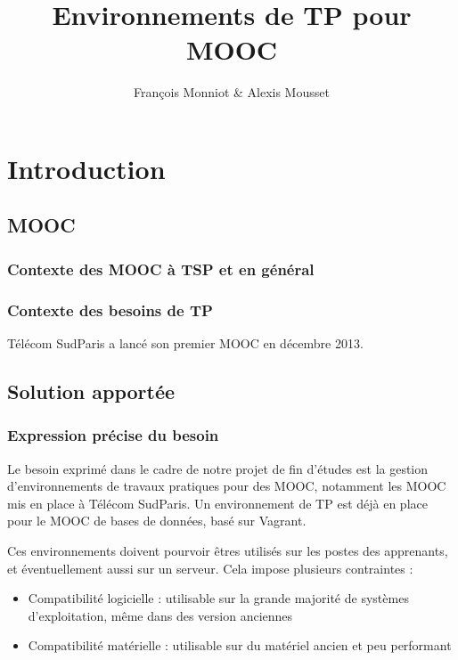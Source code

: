 \documentclass[a4paper,11pt]{report}
\title{Environnements de TP pour MOOC}
\author{François Monniot \& Alexis Mousset}
\begin{document}
\maketitle
\tableofcontents

\begin{abstract}

\end{abstract}
\thispagestyle{fancy}
\chapter{Introduction}
\thispagestyle{fancy}
\section{MOOC}

\subsection{Contexte des MOOC à TSP et en général}

\subsection{Contexte des besoins de TP}

Télécom SudParis a lancé son premier MOOC en décembre 2013.

\section{Solution apportée}

\subsection{Expression précise du besoin}

Le besoin exprimé dans le cadre de notre projet de fin d'études est la gestion d'environnements de travaux pratiques pour des MOOC, notamment les MOOC mis en place à Télécom SudParis. Un environnement de TP est déjà en place pour le MOOC de bases de données, basé sur Vagrant.

Ces environnements doivent pourvoir êtres utilisés sur les postes des apprenants, et éventuellement aussi sur un serveur. Cela impose plusieurs contraintes :
\begin{itemize}
  \item Compatibilité logicielle : utilisable sur la grande majorité de systèmes d'exploitation, même dans des version anciennes
  \item Compatibilité matérielle : utilisable sur du matériel ancien et peu performant
\end{itemize}
\end{document}
